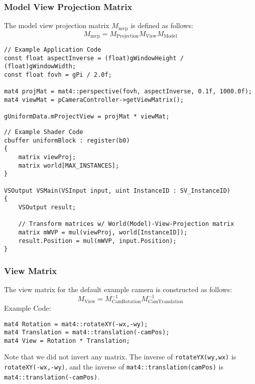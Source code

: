 \documentclass{article}
\newcommand{\MatSubText}[2]{#1_\text{#2}}
\let\lstInline\lstinline %
\newcommand{\InlCode}[1]{\lstInline[basicstyle=\ttfamily]{#1}}
\begin{document}
\subsubsection{Model View Projection Matrix}
The model view projection matrix $\MatSubText{M}{mvp}$ is defined as follows:
\begin{equation*}
\MatSubText{M}{mvp} = \MatSubText{M}{Projection}\MatSubText{M}{View}\MatSubText{M}{Model}
\end{equation*}

\begin{lstlisting}	
// Example Application Code
const float aspectInverse = (float)gWindowHeight / (float)gWindowWidth;
const float fovh = gPi / 2.0f;

mat4 projMat = mat4::perspective(fovh, aspectInverse, 0.1f, 1000.0f);
mat4 viewMat = pCameraController->getViewMatrix();

gUniformData.mProjectView = projMat * viewMat;
\end{lstlisting}

\begin{lstlisting}	
// Example Shader Code
cbuffer uniformBlock : register(b0)
{
	matrix viewProj;
	matrix world[MAX_INSTANCES];
}

VSOutput VSMain(VSInput input, uint InstanceID : SV_InstanceID)
{
	VSOutput result;

	// Transform matrices w/ World(Model)-View-Projection matrix
	matrix mWVP = mul(viewProj, world[InstanceID]);
	result.Position = mul(mWVP, input.Position);
}
\end{lstlisting}

\subsubsection{View Matrix}
The view matrix for the default example camera is constructed as follows:
\begin{equation*}
\MatSubText{M}{View} = \MatSubText{M}{CamRotation}^{-1}\MatSubText{M}{CamTranslation}^{-1}
\end{equation*}
Example Code:
\begin{lstlisting}
mat4 Rotation = mat4::rotateXY(-wx,-wy);
mat4 Translation = mat4::translation(-camPos);
mat4 View = Rotation * Translation;
\end{lstlisting}
Note that we did not invert any matrix. The inverse of \InlCode{rotateYX(wy,wx)} is \InlCode{rotateXY(-wx,-wy)}, and the inverse of \InlCode{mat4::translation(camPos)} is \InlCode{mat4::translation(-camPos)}.
\end{document}
